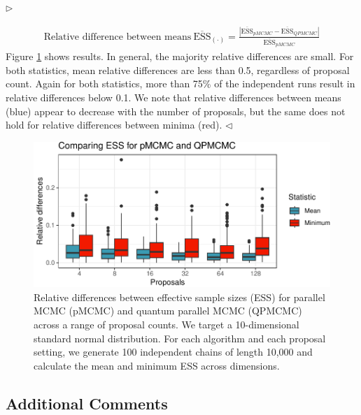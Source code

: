 \documentclass[12pt]{article}
\newenvironment{reply}{$\triangleright$\bfseries}{$\triangleleft$}
\renewenvironment{quote}
               {\list{}{\rightmargin\leftmargin}%
                \item\relax\normalfont}
               {\endlist}
\begin{document}
\begin{reply}
\begin{quote}
	\begin{align*}
		\mbox{Relative difference between means} \: \overline{\mbox{ESS}}_{(\cdot)} = \frac{\left|\overline{\mbox{ESS}}_{pMCMC} - \overline{\mbox{ESS}}_{QPMCMC}\right| }{\overline{\mbox{ESS}}_{pMCMC} }
	\end{align*}
	Figure \ref{fig:mixing} shows results.  In general, the majority relative differences are small.  For both statistics, mean relative differences are less than 0.5, regardless of proposal count.  Again for both statistics, more than 75\% of the independent runs result in relative differences below 0.1.  We note that relative differences between means (blue) appear to decrease with the number of proposals, but the same does not hold for relative differences between minima (red).
\end{quote}
\end{reply}

 \begin{figure}[!t]
	\centering
	\includegraphics[width=0.7\linewidth]{figures/pMCMCvsQPMCMC.pdf}
	\caption{Relative differences between effective sample sizes (ESS) for parallel MCMC (pMCMC) and quantum parallel MCMC (QPMCMC) across a range of proposal counts. We target a 10-dimensional standard normal distribution.  For each algorithm and each proposal setting, we generate 100 independent chains of length 10,000 and calculate the mean and minimum ESS across dimensions.}\label{fig:mixing} 
\end{figure}


\subsection*{Additional Comments}
\end{document}
